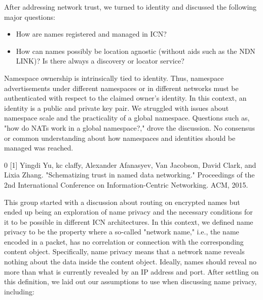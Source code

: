 \documentclass[a4paper,UKenglish]{dagrep}
\begin{document}
After addressing network trust, we turned to identity and discussed the following major questions:
%
\begin{itemize}
\item How are names registered and managed in ICN?
\item How can names possibly be location agnostic (without aids such as the NDN LINK)? Is there always a discovery or locator service?
\end{itemize}
%
Namespace ownership is intrinsically tied to identity. Thus, namespace advertisements under different namespaces or in different networks must be authenticated with respect to the claimed owner's identity. In this context, an identity is a public and private key pair. We struggled with issues about namespace scale and the practicality of a global namespace. Questions such as, "how do NATs work in a global namespace?," drove the discussion. No consensus or common understanding about how namespaces and identities should be managed was reached.

\begin{thebibliography}{0}
[1] Yingdi Yu, kc claffy, Alexander Afanasyev, Van Jacobson, David Clark, and Lixia Zhang. "Schematizing trust in named data networking." Proceedings of the 2nd International Conference on Information-Centric Networking. ACM, 2015.
\end{thebibliography}

\license

This group started with a discussion about routing on encrypted names but ended up being an exploration of name privacy and the necessary conditions for it to be possible in different ICN architectures. In this context, we defined name privacy to be the property where a so-called "network name," i.e., the name encoded in a packet, has no correlation or connection with the corresponding content object. Specifically, name privacy means that a network name reveals nothing about the data inside the content object. Ideally, names should reveal no more than what is currently revealed by an IP address and port. After settling on this definition, we laid out our assumptions to use when discussing name privacy, including:
\end{document}

